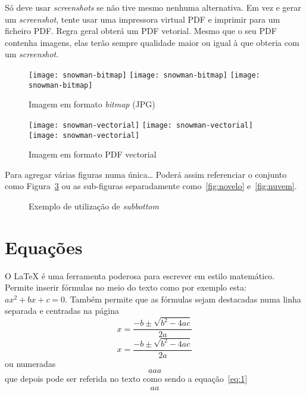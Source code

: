 Só deve usar \emph{screenshots} se não tive mesmo nenhuma alternativa.  Em vez e gerar um \emph{screenshot}, tente usar uma impressora virtual PDF e imprimir para um ficheiro PDF. Regra geral obterá um PDF vetorial. Mesmo que o seu PDF contenha imagens, elas terão sempre qualidade maior ou igual à que obteria com um \emph{screenshot}.


\begin{figure}[htbp]
	\centering
	\texttt{[image: snowman-bitmap]}
	\texttt{[image: snowman-bitmap]}
	\texttt{[image: snowman-bitmap]}
	\caption{Imagem em formato \emph{bitmap} (JPG)}
	\label{fig:Figuras_Tree_silhouettes-bitmap}
\end{figure}

\begin{figure}[htbp]
	\centering
	\texttt{[image: snowman-vectorial]}
	\texttt{[image: snowman-vectorial]}
	\texttt{[image: snowman-vectorial]}
	\caption{Imagem em formato PDF vectorial}
	\label{fig:Figuras_Tree_silhouettes-vectorial}
\end{figure}

Para agregar várias figuras numa única… Poderá assim referenciar o conjunto como Figura~\ref{fig:figura-completa} ou as sub-figuras separadamente como~\ref{fig:novelo} e~\ref{fig:nuvem}.


\begin{figure}[htbp]
	\centering
\qquad\qquad
  \caption{Exemplo de utilização de \emph{subbottom}}
  \label{fig:figura-completa}
\end{figure}

\section{Equações}

O LaTeX é uma ferramenta poderosa para escrever em estilo matemático. Permite inserir fórmulas no meio do texto como por exemplo esta: $ax^2 + bx + c = 0$. Também permite que as fórmulas sejam destacadas numa linha separada e centradas na página 
$$x = \frac{-b \pm \sqrt{b^2-4ac}}{2a}$$
\[x = \frac{-b \pm \sqrt{b^2-4ac}}{2a}\]
ou numeradas 
\begin{equation}
aaa
\label{eq:1}
\end{equation}
que depois pode ser referida no texto como sendo a equação~\ref{eq:1}
$$\begin{array}{l}
aa
\end{array}
$$

